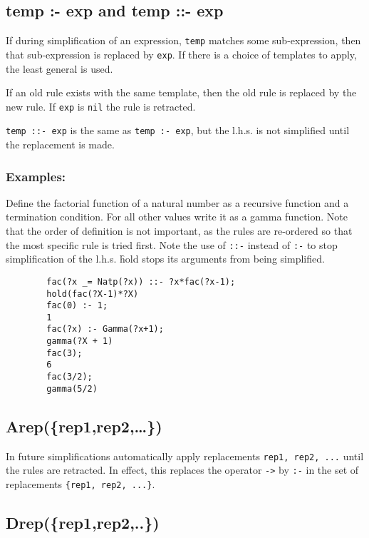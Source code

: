 \subsection{temp :- exp and temp ::- exp}
\hypertarget{reserved:rsetop}{}
\hypertarget{reserved:rsetdop}{}

If during simplification of an expression, \texttt{temp} matches some
sub-expression, then that sub-expression is replaced by \texttt{exp}.  If there
is a choice of templates to apply, the least general is used.

If an old rule exists with the same template, then the old rule is replaced by
the new rule.  If \texttt{exp} is \texttt{nil} the rule is retracted.

\texttt{temp ::- exp} is the same as \texttt{temp :- exp}, but the l.h.s. is not
simplified until the replacement is made.

\subsubsection*{Examples:}

Define the factorial function of a natural number as a recursive function and a
termination condition.  For all other values write it as a gamma function.  Note
that the order of definition is not important, as the rules are re-ordered so
that the most specific rule is tried first.  Note the use of \texttt{::-}
instead of \texttt{:-} to stop simplification of the l.h.s.  \f{hold} stops
its arguments from being simplified.
\begin{verbatim}
        fac(?x _= Natp(?x)) ::- ?x*fac(?x-1);
        hold(fac(?X-1)*?X)
        fac(0) :- 1;
        1
        fac(?x) :- Gamma(?x+1);
        gamma(?X + 1)
        fac(3);
        6
        fac(3/2);
        gamma(5/2)
\end{verbatim}



\subsection{Arep(\{rep1,rep2,\ldots\})}

In future simplifications automatically apply replacements \texttt{rep1, rep2,
  ...} until the rules are retracted.  In effect, this replaces the operator
\texttt{->} by \texttt{:-} in the set of replacements \texttt{\{rep1, rep2,
  ...\}}.


\subsection{Drep(\{rep1,rep2,..\})}

